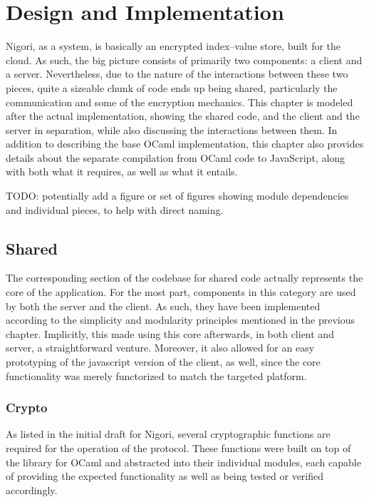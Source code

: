 \chapter{Design and Implementation} \label{chapter:implementation}
Nigori, as a system, is basically an encrypted index--value store, built for the cloud.
As such, the big picture consists of primarily two components: a client and a server.
Nevertheless, due to the nature of the interactions between these two pieces, quite a sizeable chunk of code ends up being shared, particularly the communication and some of the encryption mechanics.
This chapter is modeled after the actual implementation, showing the shared code, and the client and the server in separation, while also discussing the interactions between them.
In addition to describing the base OCaml implementation, this chapter also provides details about the separate compilation from OCaml code to JavaScript, along with both what it requires, as well as what it entails.

TODO: potentially add a figure or set of figures showing module dependencies and individual pieces, to help with direct naming.

\section{Shared}
The corresponding section of the codebase for shared code actually represents the core of the application.
For the most part, components in this category are used by both the server and the client.
As such, they have been implemented according to the simplicity and modularity principles mentioned in the previous chapter.
Implicitly, this made using this core afterwards, in both client and server, a straightforward venture.
Moreover, it also allowed for an easy prototyping of the javascript version of the client, as well, since the core functionality was merely functorized to match the targeted platform.

\subsection{Crypto}
As listed in the initial draft for Nigori, several cryptographic functions are required for the operation of the protocol.
These functions were built on top of the  library for OCaml and abstracted into their individual modules, each capable of providing the expected functionality as well as being tested or verified accordingly.

